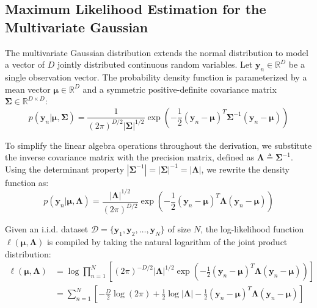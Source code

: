 \documentclass{article}
\begin{document}
\subsection{Maximum Likelihood Estimation for the Multivariate Gaussian}

The multivariate Gaussian distribution extends the normal distribution to model a vector of $D$ jointly distributed continuous random variables. Let $\mathbf{y}_n \in \mathbb{R}^D$ be a single observation vector. The probability density function is parameterized by a mean vector $\boldsymbol{\mu} \in \mathbb{R}^D$ and a symmetric positive-definite covariance matrix $\boldsymbol{\Sigma} \in \mathbb{R}^{D \times D}$:
\begin{equation}
p(\mathbf{y}_n | \boldsymbol{\mu}, \boldsymbol{\Sigma}) = \frac{1}{(2\pi)^{D/2} |\boldsymbol{\Sigma}|^{1/2}} \exp\left( -\frac{1}{2}(\mathbf{y}_n - \boldsymbol{\mu})^T \boldsymbol{\Sigma}^{-1} (\mathbf{y}_n - \boldsymbol{\mu}) \right)
\end{equation}

To simplify the linear algebra operations throughout the derivation, we substitute the inverse covariance matrix with the precision matrix, defined as $\boldsymbol{\Lambda} \triangleq \boldsymbol{\Sigma}^{-1}$. Using the determinant property $|\boldsymbol{\Sigma}^{-1}| = |\boldsymbol{\Sigma}|^{-1} = |\boldsymbol{\Lambda}|$, we rewrite the density function as:
\begin{equation}
p(\mathbf{y}_n | \boldsymbol{\mu}, \boldsymbol{\Lambda}) = \frac{|\boldsymbol{\Lambda}|^{1/2}}{(2\pi)^{D/2}} \exp\left( -\frac{1}{2}(\mathbf{y}_n - \boldsymbol{\mu})^T \boldsymbol{\Lambda} (\mathbf{y}_n - \boldsymbol{\mu}) \right)
\end{equation}

Given an i.i.d. dataset $\mathcal{D} = \{\mathbf{y}_1, \mathbf{y}_2, \dots, \mathbf{y}_N\}$ of size $N$, the log-likelihood function $\ell(\boldsymbol{\mu}, \boldsymbol{\Lambda})$ is compiled by taking the natural logarithm of the joint product distribution:
\begin{align*}
\ell(\boldsymbol{\mu}, \boldsymbol{\Lambda}) &= \log \prod_{n=1}^N \left[ (2\pi)^{-D/2} |\boldsymbol{\Lambda}|^{1/2} \exp\left( -\frac{1}{2}(\mathbf{y}_n - \boldsymbol{\mu})^T \boldsymbol{\Lambda} (\mathbf{y}_n - \boldsymbol{\mu}) \right) \right] \\
&= \sum_{n=1}^N \left[ -\frac{D}{2}\log(2\pi) + \frac{1}{2}\log|\boldsymbol{\Lambda}| - \frac{1}{2}(\mathbf{y}_n - \boldsymbol{\mu})^T \boldsymbol{\Lambda} (\mathbf{y}_n - \boldsymbol{\mu}) \right]
\end{align*}
\end{document}
